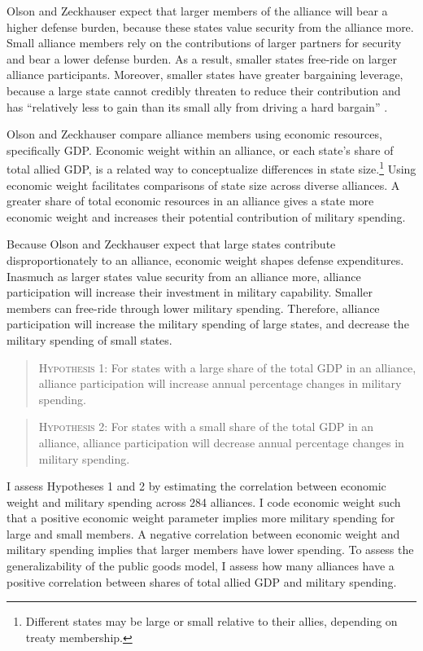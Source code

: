 \documentclass[12pt]{article}
\begin{document}
 
Olson and Zeckhauser expect that larger members of the alliance will bear a higher defense burden, because these states value security from the alliance more.
Small alliance members rely on the contributions of larger partners for security and bear a lower defense burden.
As a result, smaller states free-ride on larger alliance participants. 
Moreover, smaller states have greater bargaining leverage, because a large state cannot credibly threaten to reduce their contribution and has ``relatively less to gain than its small ally from driving a hard bargain'' \citep[pg. 274]{OlsonZeckhauser1966}. 


Olson and Zeckhauser compare alliance members using economic resources, specifically GDP.
Economic weight within an alliance, or each state's share of total allied GDP, is a related way to conceptualize differences in state size.\footnote{Different states may be large or small relative to their allies, depending on treaty membership.} 
Using economic weight facilitates comparisons of state size across diverse alliances. 
A greater share of total economic resources in an alliance gives a state more economic weight and increases their potential contribution of military spending. 


Because Olson and Zeckhauser expect that large states contribute disproportionately to an alliance, economic weight shapes defense expenditures. 
Inasmuch as larger states value security from an alliance more, alliance participation will increase their investment in military capability.
Smaller members can free-ride through lower military spending. 
Therefore, alliance participation will increase the military spending of large states, and decrease the military spending of small states. 


\begin{quote}
\textsc{Hypothesis 1}: For states with a large share of the total GDP in an alliance, alliance participation will increase annual percentage changes in military spending. 
\end{quote}


\begin{quote}
\textsc{Hypothesis 2}: For states with a small share of the total GDP in an alliance, alliance participation will decrease annual percentage changes in military spending.
\end{quote}


I assess Hypotheses 1 and 2 by estimating the correlation between economic weight and military spending across 284 alliances. 
I code economic weight such that a positive economic weight parameter implies more military spending for large and small members. 
A negative correlation between economic weight and military spending implies that larger members have lower spending. 
To assess the generalizability of the public goods model, I assess how many alliances have a positive correlation between shares of total allied GDP and military spending.  
 
\end{document}
